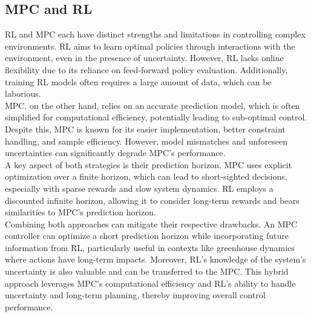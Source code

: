 \subsection{MPC and RL}
RL and MPC each have distinct strengths and limitations in controlling complex environments. RL aims to learn optimal policies through interactions with the environment, even in the presence of uncertainty. However, RL lacks online flexibility due to its reliance on feed-forward policy evaluation. Additionally, training RL models often requires a large amount of data, which can be laborious.\\
MPC, on the other hand, relies on an accurate prediction model, which is often simplified for computational efficiency, potentially leading to sub-optimal control. Despite this, MPC is known for its easier implementation, better constraint handling, and sample efficiency. However, model mismatches and unforeseen uncertainties can significantly degrade MPC's performance.\\
A key aspect of both strategies is their prediction horizon. MPC uses explicit optimization over a finite horizon, which can lead to short-sighted decisions, especially with sparse rewards and slow system dynamics. RL employs a discounted infinite horizon, allowing it to consider long-term rewards and bears similarities to MPC's prediction horizon.\\
Combining both approaches can mitigate their respective drawbacks. An MPC controller can optimize a short prediction horizon while incorporating future information from RL, particularly useful in contexts like greenhouse dynamics where actions have long-term impacts. Moreover, RL's knowledge of the system's uncertainty is also valuable and can be transferred to the MPC. This hybrid approach leverages MPC's computational efficiency and RL's ability to handle uncertainty and long-term planning, thereby improving overall control performance.

